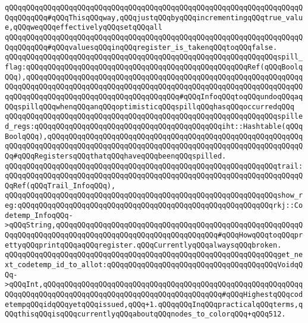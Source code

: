 \verb|qQQqqQQqqQQqqQQqqQQqqQQqqQQqqQQqqQQqqQQqqQQqqQQqqQQqqQQqqQQqqQQqqQQqqQQqqQQqqQQq#qQQqThisqQQqway,qQQqjustqQQqbyqQQqincrementingqQQqtrue_value,qQQqweqQQqeffectivelyqQQqsetqQQqall|\newline
\verb|qQQqqQQqqQQqqQQqqQQqqQQqqQQqqQQqqQQqqQQqqQQqqQQqqQQqqQQqqQQqqQQqqQQqqQQqqQQqqQQq#qQQqvaluesqQQqinqQQqregister_is_takenqQQqtoqQQqfalse.|\newline
\newline
\verb|qQQqqQQqqQQqqQQqqQQqqQQqqQQqqQQqqQQqqQQqqQQqqQQqqQQqqQQqqQQqqQQqspill_flag:qQQqqQQqqQQqqQQqqQQqqQQqqQQqqQQqqQQqqQQqqQQqqQQqqQQqRef(qQQqBoolqQQq),qQQqqQQqqQQqqQQqqQQqqQQqqQQqqQQqqQQqqQQqqQQqqQQqqQQqqQQqqQQqqQQqqQQqqQQqqQQqqQQqqQQqqQQqqQQqqQQqqQQqqQQqqQQqqQQqqQQqqQQqqQQqqQQqqQQqqQQqqQQqqQQqqQQqqQQqqQQqqQQqqQQqqQQqqQQqqQQq#qQQqInfoqQQqtoqQQqundoqQQqaqQQqspillqQQqwhenqQQqanqQQqoptimisticqQQqspillqQQqhasqQQqoccurredqQQq|\newline
\newline
\verb|qQQqqQQqqQQqqQQqqQQqqQQqqQQqqQQqqQQqqQQqqQQqqQQqqQQqqQQqqQQqqQQqspilled_regs:qQQqqQQqqQQqqQQqqQQqqQQqqQQqqQQqqQQqqQQqqQQqiht::Hashtable(qQQqBoolqQQq),qQQqqQQqqQQqqQQqqQQqqQQqqQQqqQQqqQQqqQQqqQQqqQQqqQQqqQQqqQQqqQQqqQQqqQQqqQQqqQQqqQQqqQQqqQQqqQQqqQQqqQQqqQQqqQQqqQQqqQQqqQQqqQQqqQQq#qQQqRegistersqQQqthatqQQqhaveqQQqbeenqQQqspilled.|\newline
\verb|qQQqqQQqqQQqqQQqqQQqqQQqqQQqqQQqqQQqqQQqqQQqqQQqqQQqqQQqqQQqqQQqtrail:qQQqqQQqqQQqqQQqqQQqqQQqqQQqqQQqqQQqqQQqqQQqqQQqqQQqqQQqqQQqqQQqqQQqqQQqRef(qQQqTrail_InfoqQQq),|\newline
\newline
\verb|qQQqqQQqqQQqqQQqqQQqqQQqqQQqqQQqqQQqqQQqqQQqqQQqqQQqqQQqqQQqqQQqshow_reg:qQQqqQQqqQQqqQQqqQQqqQQqqQQqqQQqqQQqqQQqqQQqqQQqqQQqqQQqqQQqrkj::Codetemp_InfoqQQq->qQQqString,qQQqqQQqqQQqqQQqqQQqqQQqqQQqqQQqqQQqqQQqqQQqqQQqqQQqqQQqqQQqqQQqqQQqqQQqqQQqqQQqqQQqqQQqqQQqqQQqqQQqqQQqqQQq#qQQqHowqQQqtoqQQqprettyqQQqprintqQQqaqQQqregister.qQQqCurrentlyqQQqalwaysqQQqbroken.|\newline
\newline
\verb|qQQqqQQqqQQqqQQqqQQqqQQqqQQqqQQqqQQqqQQqqQQqqQQqqQQqqQQqqQQqqQQqget_next_codetemp_id_to_allot:qQQqqQQqqQQqqQQqqQQqqQQqqQQqqQQqqQQqqQQqVoidqQQq->qQQqInt,qQQqqQQqqQQqqQQqqQQqqQQqqQQqqQQqqQQqqQQqqQQqqQQqqQQqqQQqqQQqqQQqqQQqqQQqqQQqqQQqqQQqqQQqqQQqqQQqqQQqqQQqqQQqqQQq#qQQqHighestqQQqcodetempqQQqidqQQqyetqQQqissued,qQQq+1.qQQqqQQqInqQQqpracticalqQQqterms,qQQqthisqQQqisqQQqcurrentlyqQQqaboutqQQqnodes_to_colorqQQq+qQQq512.|\newline
\newline
